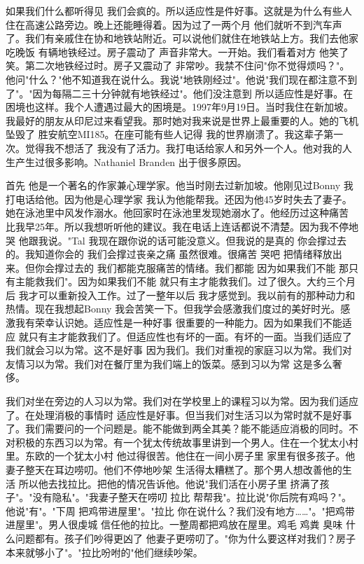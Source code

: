如果我们什么都听得见 我们会疯的。所以适应性是件好事。这就是为什么有些人住在高速公路旁边。晚上还能睡得着。因为过了一两个月 他们就听不到汽车声了。我们有亲戚住在协和地铁站附近。可以说他们就住在地铁站上方。我们去他家吃晚饭 有辆地铁经过。房子震动了 声音非常大。一开始。我们看着对方 他笑了笑。第二次地铁经过时。房子又震动了 非常吵。我禁不住问"你不觉得烦吗？"。他问"什么？"他不知道我在说什么。我说"地铁刚经过"。他说"我们现在都注意不到了"。"因为每隔二三十分钟就有地铁经过"。他们没注意到 所以适应性是好事。在困境也这样。我个人遭遇过最大的困境是。1997年9月19日。当时我住在新加坡。我最好的朋友从印尼过来看望我。那时她对我来说是世界上最重要的人。她的飞机坠毁了 胜安航空MI185。在座可能有些人记得 我的世界崩溃了。我这辈子第一次。觉得我不想活了 我没有了活力。我打电话给家人和另外一个人。他对我的人生产生过很多影响。Nathaniel Branden 出于很多原因。 

首先 他是一个著名的作家兼心理学家。他当时刚去过新加坡。他刚见过Bonny 我打电话给他。因为他是心理学家 我认为他能帮我。还因为他45岁时失去了妻子。她在泳池里中风发作溺水。他回家时在泳池里发现她溺水了。他经历过这种痛苦 比我早25年。所以我想听听他的建议。我在电话上连话都说不清楚。因为我不停地哭 他跟我说。"Tal 我现在跟你说的话可能没意义。但我说的是真的 你会撑过去的。我知道你会的 我们会撑过丧亲之痛 虽然很难。很痛苦 哭吧 把情绪释放出来。但你会撑过去的 我们都能克服痛苦的情绪。我们都能 因为如果我们不能 那只有主能救我们"。因为如果我们不能 就只有主才能救我们。过了很久。大约三个月后 我才可以重新投入工作。过了一整年以后 我才感觉到。我以前有的那种动力和热情。现在我想起Bonny 我会苦笑一下。但我学会感激我们度过的美好时光。感激我有荣幸认识她。适应性是一种好事 很重要的一种能力。因为如果我们不能适应 就只有主才能救我们了。但适应性也有坏的一面。有坏的一面。当我们适应了 我们就会习以为常。这不是好事 因为我们。我们对重视的家庭习以为常。我们对友情习以为常。我们对在餐厅里为我们端上的饭菜。感到习以为常 这是多么奢侈。 

我们对坐在旁边的人习以为常。我们对在学校里上的课程习以为常。因为我们适应了。在处理消极的事情时 适应性是好事。但当我们对生活习以为常时就不是好事了。我们需要问的一个问题是。能不能做到两全其美？能不能适应消极的同时。不对积极的东西习以为常。有一个犹太传统故事里讲到一个男人。住在一个犹太小村里。东欧的一个犹太小村 他过得很苦。他住在一间小房子里 家里有很多孩子。他妻子整天在耳边唠叨。他们不停地吵架 生活得太糟糕了。那个男人想改善他的生活 所以他去找拉比。把他的情况告诉他。他说"我们活在小房子里 挤满了孩子"。"没有隐私"。"我妻子整天在唠叨 拉比 帮帮我"。拉比说"你后院有鸡吗？"。他说"有"。"下周 把鸡带进屋里"。"拉比 你在说什么？我们没有地方……"。"把鸡带进屋里"。男人很虔城 信任他的拉比。一整周都把鸡放在屋里。鸡毛 鸡粪 臭味 什么问题都有。孩子们吵得更凶了 他妻子更唠叨了。"你为什么要这样对我们？房子本来就够小了"。"拉比吩咐的"他们继续吵架。 

